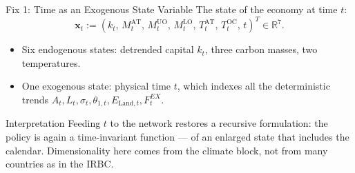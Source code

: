\documentclass[aspectratio=169,11pt]{beamer}
\newcommand{\emphc}[1]{\textcolor{harvardcrimson}{#1}}
\newcommand{\x}{\bm{x}}
\newcommand{\R}{\mathbb{R}}
\begin{document}
\begin{frame}{Fix 1: Time as an Exogenous State Variable}
The state of the economy at time $t$:
\[
\x_t := \left(k_t,\, M^{\text{AT}}_{t},\, M^{\text{UO}}_{t},\, M^{\text{LO}}_{t},\, T^{\text{AT}}_{t},\, T^{\text{OC}}_{t},\, t \right)^T \in \R^7 .
\]

\begin{itemize}
    \item Six \emphc{endogenous} states: detrended capital $k_t$, three carbon masses, two temperatures.
    \item One \emphc{exogenous} state: physical time $t$, which indexes all the deterministic trends $A_t, L_t, \sigma_t, \theta_{1,t}, E_{\text{Land},t}, F^{EX}_t$.
\end{itemize}

\vspace{0.3cm}
\begin{block}{Interpretation}
Feeding $t$ to the network restores a \emphc{recursive} formulation: the policy is again a time-invariant function --- of an enlarged state that includes the calendar. Dimensionality here comes from the \emphc{climate block}, not from many countries as in the IRBC.
\end{block}
\end{frame}
\end{document}
